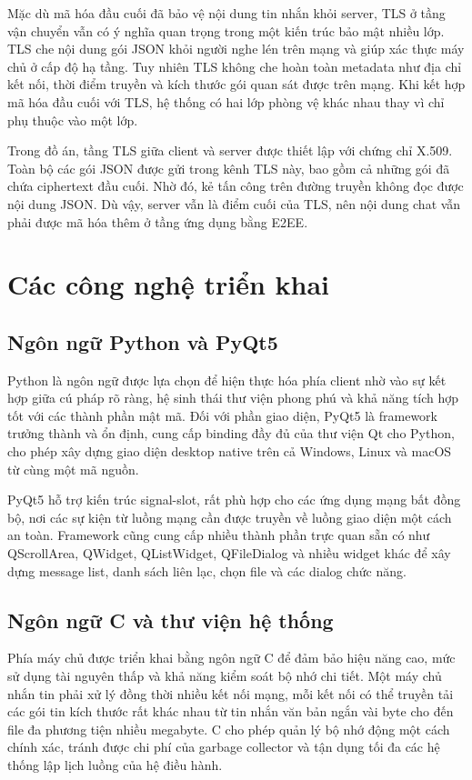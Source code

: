 Mặc dù mã hóa đầu cuối đã bảo vệ nội dung tin nhắn khỏi server, TLS ở tầng vận chuyển vẫn có ý nghĩa quan trọng trong một kiến trúc bảo mật nhiều lớp. TLS che nội dung gói JSON khỏi người nghe lén trên mạng và giúp xác thực máy chủ ở cấp độ hạ tầng. Tuy nhiên TLS không che hoàn toàn metadata như địa chỉ kết nối, thời điểm truyền và kích thước gói quan sát được trên mạng. Khi kết hợp mã hóa đầu cuối với TLS, hệ thống có hai lớp phòng vệ khác nhau thay vì chỉ phụ thuộc vào một lớp.

Trong đồ án, tầng TLS giữa client và server được thiết lập với chứng chỉ X.509. Toàn bộ các gói JSON được gửi trong kênh TLS này, bao gồm cả những gói đã chứa ciphertext đầu cuối. Nhờ đó, kẻ tấn công trên đường truyền không đọc được nội dung JSON. Dù vậy, server vẫn là điểm cuối của TLS, nên nội dung chat vẫn phải được mã hóa thêm ở tầng ứng dụng bằng E2EE.

\section{Các công nghệ triển khai}

\subsection{Ngôn ngữ Python và PyQt5}

Python là ngôn ngữ được lựa chọn để hiện thực hóa phía client nhờ vào sự kết hợp giữa cú pháp rõ ràng, hệ sinh thái thư viện phong phú và khả năng tích hợp tốt với các thành phần mật mã. Đối với phần giao diện, PyQt5 là framework trưởng thành và ổn định, cung cấp binding đầy đủ của thư viện Qt cho Python, cho phép xây dựng giao diện desktop native trên cả Windows, Linux và macOS từ cùng một mã nguồn.

PyQt5 hỗ trợ kiến trúc signal-slot, rất phù hợp cho các ứng dụng mạng bất đồng bộ, nơi các sự kiện từ luồng mạng cần được truyền về luồng giao diện một cách an toàn. Framework cũng cung cấp nhiều thành phần trực quan sẵn có như QScrollArea, QWidget, QListWidget, QFileDialog và nhiều widget khác để xây dựng message list, danh sách liên lạc, chọn file và các dialog chức năng.

\subsection{Ngôn ngữ C và thư viện hệ thống}

Phía máy chủ được triển khai bằng ngôn ngữ C để đảm bảo hiệu năng cao, mức sử dụng tài nguyên thấp và khả năng kiểm soát bộ nhớ chi tiết. Một máy chủ nhắn tin phải xử lý đồng thời nhiều kết nối mạng, mỗi kết nối có thể truyền tải các gói tin kích thước rất khác nhau từ tin nhắn văn bản ngắn vài byte cho đến file đa phương tiện nhiều megabyte. C cho phép quản lý bộ nhớ động một cách chính xác, tránh được chi phí của garbage collector và tận dụng tối đa các hệ thống lập lịch luồng của hệ điều hành.

